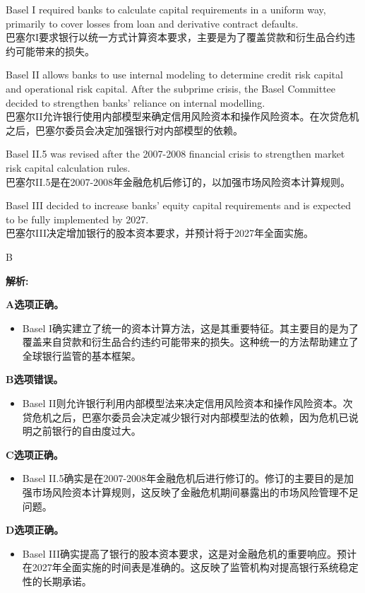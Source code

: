 \documentclass{article}
\newenvironment{explanation}
{\textbf{解析:}\par}
{\par}
\begin{document}
\begin{choices}
    \item Basel I required banks to calculate capital requirements in a uniform way, primarily to cover losses from loan and derivative contract defaults.\\巴塞尔I要求银行以统一方式计算资本要求，主要是为了覆盖贷款和衍生品合约违约可能带来的损失。
    \item Basel II allows banks to use internal modeling to determine credit risk capital and operational risk capital. After the subprime crisis, the Basel Committee decided to strengthen banks' reliance on internal modelling.\\巴塞尔II允许银行使用内部模型来确定信用风险资本和操作风险资本。在次贷危机之后，巴塞尔委员会决定加强银行对内部模型的依赖。
    \item Basel II.5 was revised after the 2007-2008 financial crisis to strengthen market risk capital calculation rules.\\巴塞尔II.5是在2007-2008年金融危机后修订的，以加强市场风险资本计算规则。
    \item Basel III decided to increase banks' equity capital requirements and is expected to be fully implemented by 2027.\\巴塞尔III决定增加银行的股本资本要求，并预计将于2027年全面实施。
\end{choices}

\begin{correctanswer}
    B
\end{correctanswer}

\begin{explanation}
    \textbf{A选项正确。}
    \begin{itemize}
        \item Basel I确实建立了统一的资本计算方法，这是其重要特征。其主要目的是为了覆盖来自贷款和衍生品合约违约可能带来的损失。这种统一的方法帮助建立了全球银行监管的基本框架。
    \end{itemize}

    \textbf{B选项错误。}
    \begin{itemize}
        \item Basel II则允许银行利用内部模型法来决定信用风险资本和操作风险资本。次贷危机之后，巴塞尔委员会决定减少银行对内部模型法的依赖，因为危机已说明之前银行的自由度过大。
    \end{itemize}

    \textbf{C选项正确。}
    \begin{itemize}
        \item Basel II.5确实是在2007-2008年金融危机后进行修订的。修订的主要目的是加强市场风险资本计算规则，这反映了金融危机期间暴露出的市场风险管理不足问题。
    \end{itemize}

    \textbf{D选项正确。}
    \begin{itemize}
        \item Basel III确实提高了银行的股本资本要求，这是对金融危机的重要响应。预计在2027年全面实施的时间表是准确的。这反映了监管机构对提高银行系统稳定性的长期承诺。
    \end{itemize}
\end{explanation}
\end{document}
